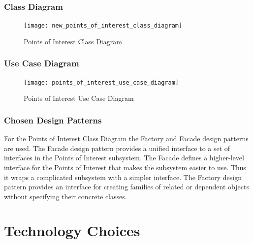 \documentclass{article}
\begin{document}
        \subsubsection{Class Diagram}
	
	  \begin{figure}[!h]
            \centering
            \texttt{[image: new\_points\_of\_interest\_class\_diagram]}
            \caption{Points of Interest Class Diagram}
            \label{Points of Interest Class Diagram}
        \end{figure}
	
        \subsubsection{Use Case Diagram}
	
	 \begin{figure}[!h]
            \centering
            \texttt{[image: points\_of\_interest\_use\_case\_diagram]}
            \caption{Points of Interest Use Case Diagram}
            \label{Points of Interest Use Case Diagram}
        \end{figure}
	
        \subsubsection{Chosen Design Patterns}
	 For the Points of Interest Class Diagram the Factory and Facade design patterns are used. The Facade design pattern provides a unified interface to a set of interfaces in the Points of Interest subsystem. The Facade defines a higher-level interface for the Points of Interest that makes the subsystem easier to use. Thus it wraps a complicated subsystem with a simpler interface. The Factory design pattern provides an interface for creating families of related or dependent objects without specifying their concrete classes.
	 
\section{Technology Choices}

\end{document}
